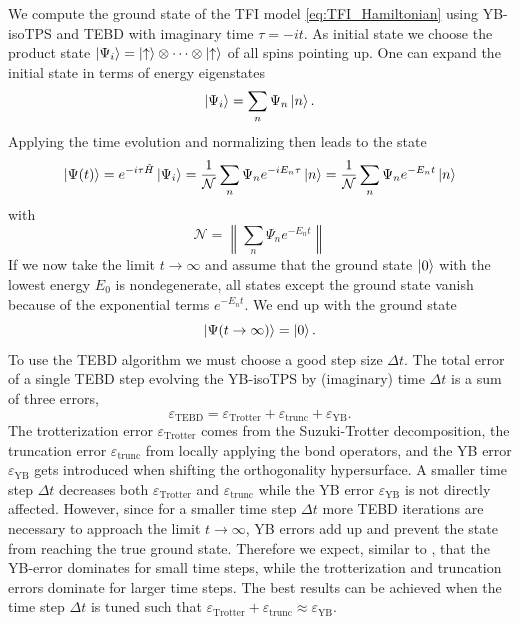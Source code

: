 We compute the ground state of the TFI model \eqref{eq:TFI_Hamiltonian} using YB-isoTPS and TEBD with imaginary time $\tau = -i t$. As initial state we choose the product state $\ket{\Psi_i}=\ket{\uparrow}\otimes\cdots\otimes\ket{\uparrow}$ of all spins pointing up. One can expand the initial state in terms of energy eigenstates
\begin{equation}
	\ket{\Psi_i} = \sum_{n} \Psi_n \ket{n}.
\end{equation}
Applying the time evolution and normalizing then leads to the state
\begin{equation}
	\ket{\Psi(t)} = e^{-i\tau\hat{H}} \ket{\Psi_i} = \frac{1}{\mathcal{N}} \sum_{n} \Psi_n e^{-iE_n\tau} \ket{n} = \frac{1}{\mathcal{N}} \sum_{n} \Psi_n e^{-E_nt} \ket{n}
\end{equation}
with
\begin{equation}
	\mathcal{N} = \left\lVert\sum_{n} \Psi_n e^{-E_nt}\right\rVert
\end{equation}
If we now take the limit $t \rightarrow \infty$ and assume that the ground state $\ket{0}$ with the lowest energy $E_0$ is nondegenerate, all states except the ground state vanish because of the exponential terms $e^{-E_nt}$. We end up with the ground state
\begin{equation}
	\ket{\Psi(t\rightarrow\infty)} = \ket{0}.
\end{equation}
To use the TEBD algorithm we must choose a good step size $\Delta t$. The total error of a single TEBD step evolving the YB-isoTPS by (imaginary) time $\Delta t$ is a sum of three errors,
\begin{equation}
	\varepsilon_\text{TEBD} = \varepsilon_\text{Trotter} + \varepsilon_\text{trunc} + \varepsilon_{\text{YB}}.
\end{equation} 
The trotterization error $\varepsilon_\text{Trotter}$ comes from the Suzuki-Trotter decomposition, the truncation error $\varepsilon_\text{trunc}$ from locally applying the bond operators, and the YB error $\varepsilon_{\text{YB}}$ gets introduced when shifting the orthogonality hypersurface. A smaller time step $\Delta t$ decreases both $\varepsilon_\text{Trotter}$ and $\varepsilon_\text{trunc}$ while the YB error $\varepsilon_{\text{YB}}$ is not directly affected. However, since for a smaller time step $\Delta t$ more TEBD iterations are necessary to approach the limit $t\rightarrow\infty$, YB errors add up and prevent the state from reaching the true ground state. Therefore we expect, similar to \cite{cite:isometric_tensor_network_states_in_two_dimensions, cite:efficient_simulation_of_dynamics_in_two_dimensional_quantum_spin_systems}, that the YB-error dominates for small time steps, while the trotterization and truncation errors dominate for larger time steps. The best results can be achieved when the time step $\Delta t$ is tuned such that $\varepsilon_\text{Trotter} + \varepsilon_\text{trunc} \approx \varepsilon_{\text{YB}}$. \par
